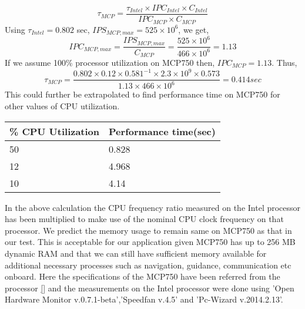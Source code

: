         \begin{equation}
        \tau_{MCP}=\frac{\tau_{Intel} \times IPC_{Intel} \times C_{Intel} }{IPC_{MCP} \times C_{MCP}}
        \end{equation}
        \noindent Using $\tau_{Intel} = 0.802$ sec, $IPS_{MCP,max} = 525\times 10^{6}$, we get,
        \begin{equation}
        IPC_{MCP,max} = \frac{IPS_{MCP,max}}{C_{MCP}} = \frac{525\times 10^{6}}{466\times 10^{6}}= 1.13
        \end{equation}
%
        \noindent If we assume 100\% processor utilization on MCP750 then, $IPC_{MCP} = 1.13.$ Thus,
%
\begin{equation}
        \tau_{MCP}=\frac{0.802 \times 0.12 \times 0.581^{-1} \times 2.3 \times 10^{9} \times 0.573}{1.13 \times 466\times 10^{6}} = 0.414 sec
        \end{equation}\newline
%
\noindent  This could further be extrapolated to find performance time on MCP750 for other values of CPU utilization.\newline
% 
        \begin{table}[h]
                \centering
                
                \begin{tabular}{ |l|l| }
                        \hline
                        \% CPU Utilization & Performance time(sec)\\ \hline
                        50 & 0.828 \\ \hline
                        12 & 4.968 \\ \hline
                        10 & 4.14 \\
                        \hline
                \end{tabular}
        \end{table}
%
\noindent
In the above calculation the CPU frequency ratio measured on the Intel processor has been multiplied to make use of the nominal CPU clock frequency on that processor. We predict the memory usage to remain same on MCP750 as that in our test.  This is acceptable for our application given MCP750 has up to 256 MB dynamic RAM and that we can still have sufficient memory available for additional necessary processes such as navigation, guidance, communication etc onboard. Here the specifications of the MCP750 have been referred from the processor \ref{} and the measurements on the Intel processor were done using 'Open Hardware Monitor v.0.7.1-beta','Speedfan v.4.5' and 'Pc-Wizard v.2014.2.13'.
